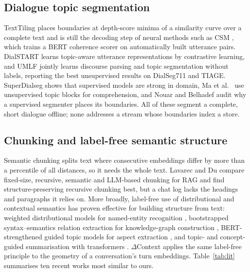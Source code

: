 \documentclass[journal]{IEEEtran}
\newcommand{\dc}{$\Delta$Context}
\begin{document}
\subsection{Dialogue topic segmentation}
TextTiling \cite{hearst1997texttiling} places boundaries at depth-score minima
of a similarity curve over a complete text and is still the decoding step of
neural methods such as CSM \cite{xing2021csm}, which trains a BERT coherence
scorer on automatically built utterance pairs. DialSTART
\cite{gao2023dialstart} learns topic-aware utterance representations by
contrastive learning, and UMLF \cite{xu2025umlf} jointly learns discourse
parsing and topic segmentation without labels, reporting the best unsupervised
results on DialSeg711 and TIAGE. SuperDialseg \cite{jiang2023superdialseg}
shows that supervised models are strong in domain, Ma et al.\
\cite{ma2024topicaware} use unsupervised topic blocks for comprehension, and
Nouar and Belhadef \cite{nouar2026boundary} audit why a supervised segmenter
places its boundaries. All of these segment a complete, short dialogue offline;
none addresses a stream whose boundaries index a store.

\subsection{Chunking and label-free semantic structure}
Semantic chunking \cite{langchain2024semantic} splits text where consecutive
embeddings differ by more than a percentile of all distances, so it needs the
whole text. Lavarec and Du \cite{lavarec2026chunking} compare fixed-size,
recursive, semantic and LLM-based chunking for RAG and find structure-preserving
recursive chunking best, but a chat log lacks the headings and paragraphs it
relies on. More broadly, label-free use of distributional and contextual
semantics has proven effective for building structure from text: weighted
distributional models for named-entity recognition \cite{veena2023agroner}, bootstrapped
syntax--semantics relation extraction for knowledge-graph construction
\cite{veena2023relation}, BERT-strengthened guided topic models for aspect
extraction \cite{venugopalan2022guidedlda}, and topic- and concept-guided
summarisation with transformers \cite{gurusamy2023summarization}. \dc{}
applies the same label-free principle to the geometry of a conversation's turn
embeddings. Table~\ref{tab:lit} summarises ten recent works most similar to
ours.
\end{document}
